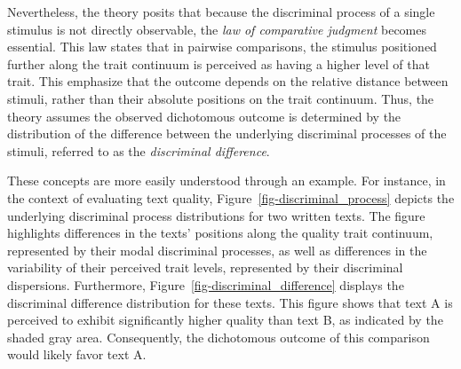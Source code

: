 \documentclass[
  authoryear,
  preprint,
  1p]{elsarticle}
\begin{document}
Nevertheless, the theory posits that because the discriminal process of
a single stimulus is not directly observable, the \emph{law of
comparative judgment} becomes essential. This law states that in
pairwise comparisons, the stimulus positioned further along the trait
continuum is perceived as having a higher level of that trait. This
emphasize that the outcome depends on the relative distance between
stimuli, rather than their absolute positions on the trait continuum.
Thus, the theory assumes the observed dichotomous outcome is determined
by the distribution of the difference between the underlying discriminal
processes of the stimuli, referred to as the \emph{discriminal
difference}.

These concepts are more easily understood through an example. For
instance, in the context of evaluating text quality,
Figure~\ref{fig-discriminal_process} depicts the underlying discriminal
process distributions for two written texts. The figure highlights
differences in the texts' positions along the quality trait continuum,
represented by their modal discriminal processes, as well as differences
in the variability of their perceived trait levels, represented by their
discriminal dispersions. Furthermore,
Figure~\ref{fig-discriminal_difference} displays the discriminal
difference distribution for these texts. This figure shows that text A
is perceived to exhibit significantly higher quality than text B, as
indicated by the shaded gray area. Consequently, the dichotomous outcome
of this comparison would likely favor text A.
\end{document}

